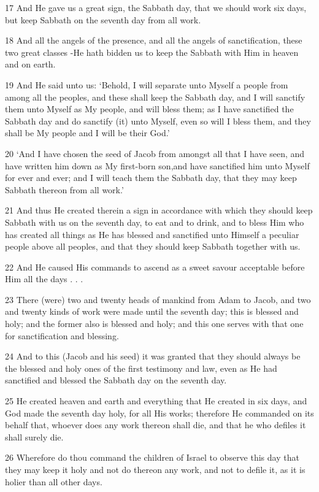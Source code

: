 \par 17 And He gave us a great sign, the Sabbath day, that we should work six days, but keep Sabbath on the seventh day from all work.
\par 18 And all the angels of the presence, and all the angels of sanctification, these two great classes -He hath bidden us to keep the Sabbath with Him in heaven and on earth.
\par 19 And He said unto us: ‘Behold, I will separate unto Myself a people from among all the peoples, and these shall keep the Sabbath day, and I will sanctify them unto Myself as My people, and will bless them; as I have sanctified the Sabbath day and do sanctify (it) unto Myself, even so will I bless them, and they shall be My people and I will be their God.’
\par 20 ‘And I have chosen the seed of Jacob from amongst all that I have seen, and have written him down as My first-born son,and have sanctified him unto Myself for ever and ever; and I will teach them the Sabbath day, that they may keep Sabbath thereon from all work.’
\par 21 And thus He created therein a sign in accordance with which they should keep Sabbath with us on the seventh day, to eat and to drink, and to bless Him who has created all things as He has blessed and sanctified unto Himself a peculiar people above all peoples, and that they should keep Sabbath together with us.
\par 22 And He caused His commands to ascend as a sweet savour acceptable before Him all the days . . .
\par 23 There (were) two and twenty heads of mankind from Adam to Jacob, and two and twenty kinds of work were made until the seventh day; this is blessed and holy; and the former also is blessed and holy; and this one serves with that one for sanctification and blessing.
\par 24 And to this (Jacob and his seed) it was granted that they should always be the blessed and holy ones of the first testimony and law, even as He had sanctified and blessed the Sabbath day on the seventh day.
\par 25 He created heaven and earth and everything that He created in six days, and God made the seventh day holy, for all His works; therefore He commanded on its behalf that, whoever does any work thereon shall die, and that he who defiles it shall surely die.
\par 26 Wherefore do thou command the children of Israel to observe this day that they may keep it holy and not do thereon any work, and not to defile it, as it is holier than all other days.
